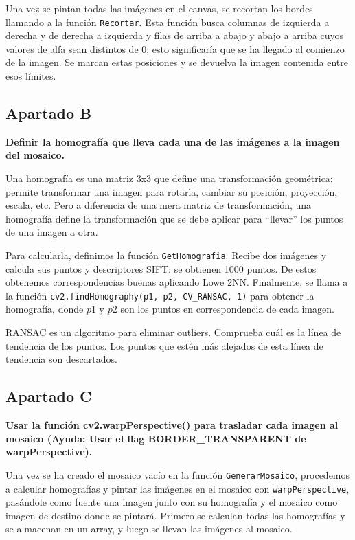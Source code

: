 \documentclass[12pt,spanish]{article} %
\begin{document}
Una vez se pintan todas las imágenes en el canvas, se recortan los bordes llamando a la función \texttt{Recortar}. Esta función busca columnas de izquierda a derecha y de derecha a izquierda y filas de arriba a abajo y abajo a arriba cuyos valores de alfa sean distintos de 0; esto significaría que se ha llegado al comienzo de la imagen. Se marcan estas posiciones y se devuelva la imagen contenida entre esos límites.

\subsection{Apartado B}

\textbf{
Definir la homografía que lleva cada una de las imágenes a la imagen del mosaico.
}

Una homografía es una matriz 3x3 que define una transformación geométrica: permite transformar una imagen para rotarla, cambiar su posición, proyección, escala, etc. Pero a diferencia de una mera matriz de transformación, una homografía define la transformación que se debe aplicar para ``llevar'' los puntos de una imagen a otra.

Para calcularla, definimos la función \texttt{GetHomografia}. Recibe dos imágenes y calcula sus puntos y descriptores SIFT: se obtienen 1000 puntos. De estos obtenemos correspondencias buenas aplicando Lowe 2NN. Finalmente, se llama a la función \texttt{cv2.findHomography(p1, p2, CV\_RANSAC, 1)} para obtener la homografía, donde $p1$ y $p2$ son los puntos en correspondencia de cada imagen.

RANSAC es un algoritmo para eliminar outliers. Comprueba cuál es la línea de tendencia de los puntos. Los puntos que estén más alejados de esta línea de tendencia son descartados.

\subsection{Apartado C}

\textbf{
Usar la función cv2.warpPerspective() para trasladar cada imagen al mosaico (Ayuda: Usar el flag BORDER\_TRANSPARENT de warpPerspective).
}

Una vez se ha creado el mosaico vacío en la función \texttt{GenerarMosaico}, procedemos a calcular homografías y pintar las imágenes en el mosaico con \texttt{warpPerspective}, pasándole como fuente una imagen junto con su homografía y el mosaico como imagen de destino donde se pintará. Primero se calculan todas las homografías y se almacenan en un array, y luego se llevan las imágenes al mosaico.
\end{document}
